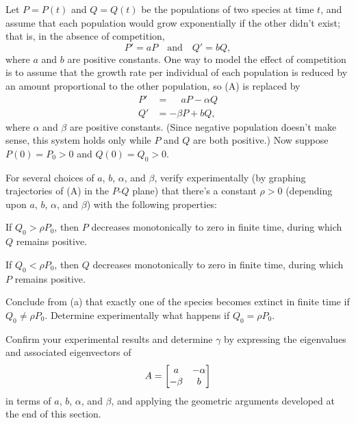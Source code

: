 \begin{exerciselist}
\item\label{exer:10.4.42}\Lex
Let $P=P(t)$ and $Q=Q(t)$ be the populations of two species at time
$t$, and assume that each population would grow exponentially if the
other didn't exist; that is, in the absence of competition,
\[
P'=aP \quad\text{and}\quad Q'=bQ,
\tag{A}
\]
where $a$ and $b$ are positive constants. One way to model the effect
of competition is to assume that the growth rate per individual of
each population is reduced by an amount proportional to the other
population, so (A) is replaced by
\begin{align*}
P'&=\phantom{-}aP-\alpha Q\\
Q'&=-\beta P+bQ,
\end{align*}
where $\alpha$ and $\beta$ are positive constants. (Since negative
population doesn't make sense, this system holds only while $P$ and
$Q$ are both positive.) Now suppose $P(0)=P_0>0$ and
$Q(0)=Q_0>0$.

\begin{alist}
\item %
For several choices of $a$, $b$, $\alpha$, and $\beta$, verify
experimentally
(by graphing trajectories of (A) in the $P$-$Q$ plane) that there's a
constant $\rho>0$ (depending upon $a$, $b$, $\alpha$, and $\beta$) with the
following properties:
\begin{rmlist}
\item %
If $Q_0>\rho P_0$, then $P$ decreases monotonically to zero
in finite time, during which $Q$ remains positive.
\item %
If $Q_0<\rho P_0$, then $Q$ decreases monotonically to zero in
finite time, during which $P$ remains positive.
\end{rmlist}
\item %
Conclude from  (a) that exactly one of the species
becomes extinct in finite time if $Q_0\ne\rho P_0$. Determine
experimentally what happens if $Q_0=\rho P_0$.
\item %
Confirm your experimental results and determine $\gamma$ by expressing
the eigenvalues and associated eigenvectors of
\[
A=\begin{bmatrix}a&-\alpha\\-\beta&b\end{bmatrix}
\]
in terms of $a$, $b$, $\alpha$, and $\beta$, and applying the geometric
arguments developed at the end of this section.
\end{alist}

\end{exerciselist}


